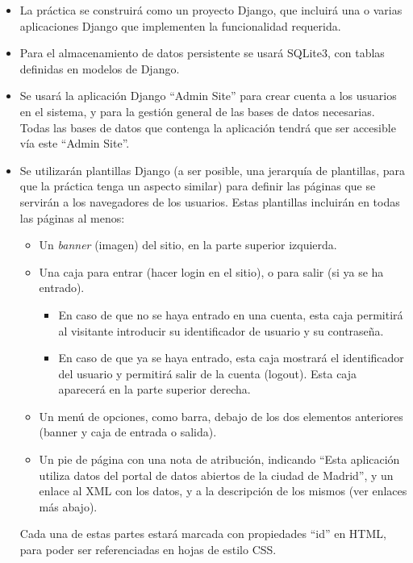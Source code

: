 \begin{itemize}

  \item La práctica se construirá como un proyecto Django, que incluirá una o varias aplicaciones Django que implementen la funcionalidad requerida.

  \item Para el almacenamiento de datos persistente se usará SQLite3, con tablas definidas en modelos de Django.

  \item Se usará la aplicación Django ``Admin Site'' para crear cuenta a los usuarios en el sistema, y para la gestión general de las bases de datos necesarias. Todas las bases de datos que contenga la aplicación tendrá que ser accesible vía este ``Admin Site''.

  \item Se utilizarán plantillas Django (a ser posible, una jerarquía de plantillas, para que la práctica tenga un aspecto similar) para definir las páginas que se servirán a los navegadores de los usuarios. Estas plantillas incluirán en todas las páginas al menos:
  \begin{itemize}
  \item Un \emph{banner} (imagen) del sitio, en la parte superior izquierda.
  \item Una caja para entrar (hacer login en el sitio), o para salir (si ya se ha entrado).
  \begin{itemize}
    \item En caso de que no se haya entrado en una cuenta, esta caja permitirá al visitante introducir su identificador de usuario y su contraseña. 
    \item En caso de que ya se haya entrado, esta caja mostrará el identificador del usuario y permitirá salir de la cuenta (logout). Esta caja aparecerá en la parte superior derecha.
  \end{itemize}
  \item Un menú de opciones, como barra, debajo de los dos elementos anteriores (banner y caja de entrada o salida).
  \item Un pie de página con una nota de atribución, indicando ``Esta aplicación utiliza datos del portal de datos abiertos de la ciudad de Madrid'', y un enlace al XML con los datos, y a la descripción de los mismos (ver enlaces más abajo).
  \end{itemize}

Cada una de estas partes estará marcada con propiedades ``id'' en HTML, para poder ser referenciadas en hojas de estilo CSS.


\end{itemize}
